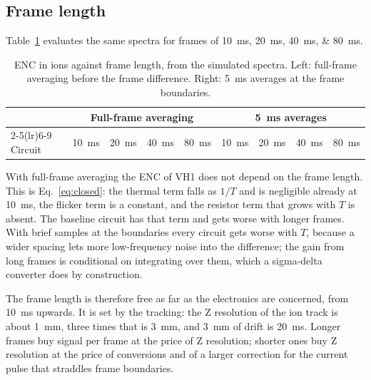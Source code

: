 \documentclass[11pt,a4paper]{article}
\begin{document}
\subsection{Frame length}
\label{sec:vh1frame}
%
Table~\ref{tab:vh1buckets} evaluates the same spectra for frames of
\SIlist{10;20;40;80}{ms}.
%
\begin{table}[htbp]\centering
\caption{ENC in ions against frame length, from the simulated spectra.
Left: full-frame averaging before the frame difference. Right: \SI{5}{ms}
averages at the frame boundaries.}
\begin{tabular}{lcccccccc}
\toprule
& \multicolumn{4}{c}{Full-frame averaging} & \multicolumn{4}{c}{\SI{5}{ms} averages}\\
\cmidrule(lr){2-5}\cmidrule(lr){6-9}
Circuit & \SI{10}{ms} & \SI{20}{ms} & \SI{40}{ms} & \SI{80}{ms} & \SI{10}{ms} & \SI{20}{ms} & \SI{40}{ms} & \SI{80}{ms}\\
\midrule

\end{tabular}
\label{tab:vh1buckets}
\end{table}
%
With full-frame averaging the ENC of VH1 does not depend on the frame
length. This is Eq.~\eqref{eq:closed}: the thermal term falls as $1/T$ and
is negligible already at \SI{10}{ms}, the flicker term is a constant, and
the resistor term that grows with $T$ is absent. The baseline circuit has
that term and gets worse with longer frames. With brief samples at the
boundaries every circuit gets worse with $T$, because a wider spacing lets
more low-frequency noise into the difference; the gain from long frames is
conditional on integrating over them, which a sigma-delta converter does
by construction.

The frame length is therefore free as far as the electronics are
concerned, from \SI{10}{ms} upwards. It is set by the tracking: the Z
resolution of the ion track is about \SI{1}{mm}, three times that is
\SI{3}{mm}, and \SI{3}{mm} of drift is \SI{20}{ms}. Longer frames buy signal
per frame at the price of Z resolution; shorter ones buy Z resolution at the
price of conversions and of a larger correction for the current pulse that
straddles frame boundaries.

\end{document}
